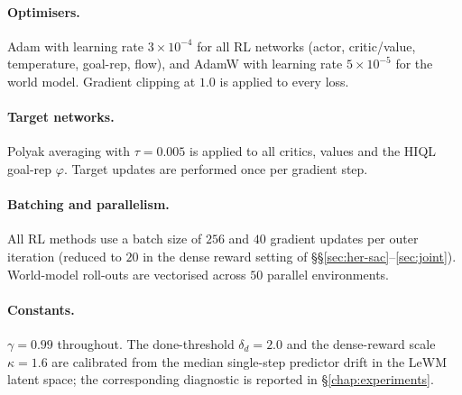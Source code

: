 \paragraph{Optimisers.} Adam with learning rate $3\!\times\!10^{-4}$
for all RL networks (actor, critic/value, temperature, goal-rep,
flow), and AdamW with learning rate $5\!\times\!10^{-5}$ for the
world model. Gradient clipping at $1.0$ is applied to every loss.

\paragraph{Target networks.} Polyak averaging with $\tau = 0.005$ is
applied to all critics, values and the HIQL goal-rep
$\varphi$. Target updates are performed once per gradient step.

\paragraph{Batching and parallelism.} All RL methods use a batch size
of $256$ and $40$ gradient updates per outer iteration (reduced to
$20$ in the dense reward setting of \S\S\ref{sec:her-sac}--\ref{sec:joint}).
World-model roll-outs are vectorised across $50$ parallel
environments.

\paragraph{Constants.} $\gamma = 0.99$ throughout. The done-threshold
$\delta_d = 2.0$ and the dense-reward scale $\kappa = 1.6$ are
calibrated from the median single-step predictor drift in the LeWM
latent space; the corresponding diagnostic is reported in
\S\ref{chap:experiments}. 


